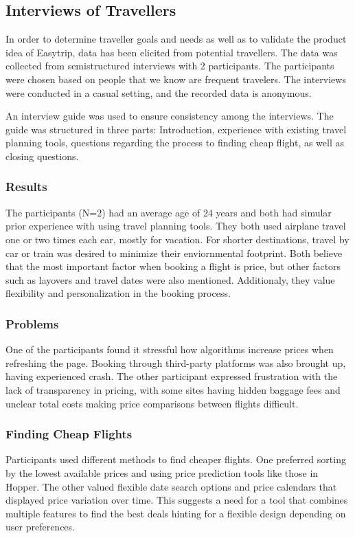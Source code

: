 \subsection{Interviews of Travellers}
In order to determine traveller goals and needs as well as to validate the product idea of Easytrip, data has been elicited from potential travellers. The data was collected from semistructured interviews with 2 participants. The participants were chosen based on people that we know are frequent travelers. The interviews were conducted in a casual setting, and the recorded data is anonymous.

An interview guide was used to ensure consistency among the interviews. The guide was structured in three parts: Introduction, experience with existing travel planning tools, questions regarding the process to finding cheap flight, as well as closing questions. 

\subsubsection{Results}
The participants (N=2) had an average age of 24 years and both had simular prior experience with using travel planning tools. They both used airplane travel one or two times each ear, mostly for vacation. For shorter destinations, travel by car or train was desired to minimize their enviornmental footprint. Both believe that the most important factor when booking a flight is price, but other factors such as layovers and travel dates were also mentioned. Additionaly, they value flexibility and personalization in the booking process. 

\subsubsection{Problems}
One of the participants found it stressful how algorithms increase prices when refreshing the page. Booking through third-party platforms was also brought up, having experienced crash. The other participant expressed frustration with the lack of transparency in pricing, with some sites having hidden baggage fees and unclear total costs making price comparisons between flights difficult. 

\subsubsection{Finding Cheap Flights}
Participants used different methods to find cheaper flights. One preferred sorting by the lowest available prices and using price prediction tools like those in Hopper. The other valued flexible date search options and price calendars that displayed price variation over time. This suggests a need for a tool that combines multiple features to find the best deals hinting for a flexible design depending on user preferences.


